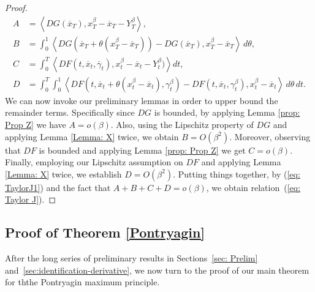 \documentclass[12pt,reqno]{amsart}
\numberwithin{equation}{section}  %
\newcommand{\1}{{\bf 1}}
\newcommand{\2}{{\bf 2}}
\theoremstyle{remark}
\theoremstyle{remark}
\begin{document}
\begin{proof}
   \begin{align*}
A&=\left<DG(\overline{x}_{T}),x^{\beta}_{T}-\overline{x}_{T}-Y^{\beta}_{T} \right>,\\
       B&=\int_{0}^{1}\left<DG(\overline{x}_{T}+\theta (x^{\beta}_{T}-\overline{x}_{T}))-DG(\overline{x}_{T}),x^{\beta}_{T}-\overline{x}_{T} \right>\, d\theta,\\
       C&=\int_{0}^{T}\left< DF(t,\overline{x}_{t},\overline{\gamma}_{t}),x^{\beta}_{t}-\overline{x}_{t}-Y^{\beta}_{t})\right>dt,\\
       D&=\int_{0}^{T}\int_{0}^{1}\left<DF(t,\overline{x}_{t}+\theta (x^{\beta}_{t}-\overline{x}_{t}),\gamma^{\beta}_{t})-DF(t,\overline{x}_{t},\gamma^{\beta}_{t}),x^{\beta}_{t}-\overline{x}_{t} \right>\, d\theta \,dt.
   \end{align*}
   We can now invoke our preliminary lemmas in order to upper bound the remainder terms.
   Specifically since $DG$ is bounded, by applying Lemma \ref{prop: Prop Z} we have $A=o(\beta)$. Also, using the Lipschitz property of $DG$ and applying Lemma \ref{Lemma: X} twice, we obtain $B=O(\beta^{2})$. Moreover, observing that $DF$ is bounded and applying Lemma \ref{prop: Prop Z} we get $C=o(\beta)$. Finally, employing our Lipschitz assumption on $DF$ and applying Lemma \ref{Lemma: X} twice, we establish $D=O(\beta^2)$. Putting things together, by (\ref{eq: TaylorJ1}) and the fact that $A+B+C+D=o(\beta)$, we obtain relation~(\ref{eq: Taylor J}).
 \end{proof}


\subsection{Proof of Theorem \ref{Pontryagin}}
        After the long series of preliminary results in Sections~\ref{sec: Prelim} and~\ref{sec:identification-derivative}, we now turn to the proof of our main theorem for ththe Pontryagin maximum principle.
        
\end{document}
